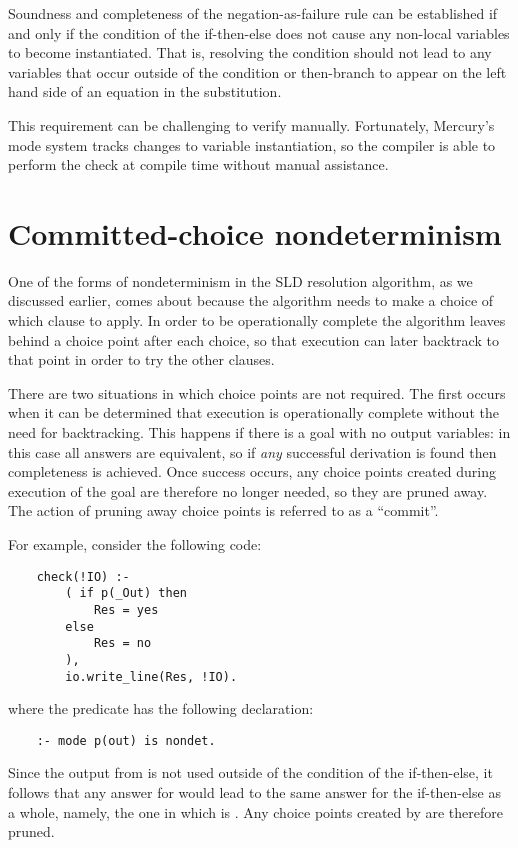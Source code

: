 Soundness\label{gi:soundness2} and completeness\label{gi:completeness2}
of the negation-as-failure rule
can be established if and only if
the condition of the if-then-else
does not cause any non-local variables to become instantiated.
That is, resolving the condition
should not lead to any variables
that occur outside of the condition or then-branch
to appear on the left hand side of an equation in the substitution.

This requirement can be challenging to verify manually.
Fortunately,
Mercury's mode system tracks changes to variable instantiation,
so the compiler is able to perform the check at compile time
without manual assistance.



\section{Committed-choice nondeterminism}
\label{sec:committed-choice}

One of the forms of nondeterminism in the SLD resolution algorithm,
as we discussed earlier,
comes about because the algorithm needs to make a choice
of which clause to apply.
In order to be operationally complete
the algorithm leaves behind a choice point after each choice,
so that execution can later backtrack to that point
in order to try the other clauses.

There are two situations in which choice points are not required.
The first occurs when it can be determined that execution is
operationally complete without the need for backtracking.
This happens if there is a goal with no output variables:
in this case all answers are equivalent,
so if \emph{any} successful derivation is found
then completeness is achieved.
Once success occurs,
any choice points created during execution of the goal
are therefore no longer needed,
so they are pruned away.
The action of pruning away choice points
is referred to as a ``commit\label{gi:commit}''.

For example, consider the following code:
\begin{verbatim}
    check(!IO) :-
        ( if p(_Out) then
            Res = yes
        else
            Res = no
        ),
        io.write_line(Res, !IO).
\end{verbatim}
where the predicate  has the following  declaration:
\begin{verbatim}
    :- mode p(out) is nondet.
\end{verbatim}
Since the output from  is not used
outside of the condition of the if-then-else,
it follows that any answer for 
would lead to the same answer for the if-then-else as a whole,
namely, the one in which  is .
Any choice points created by  are therefore pruned.

